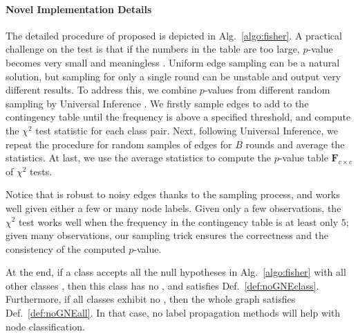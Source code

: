\paragraph{Novel Implementation Details}
The detailed procedure of proposed \methodtest is depicted in Alg.~\ref{algo:fisher}.
A practical challenge on the test is that if the numbers in the table are too large, $p$-value becomes very small and meaningless \cite{lin2013research}.
Uniform edge sampling can be a natural solution, but sampling for only a single round can be unstable and output very different results.
To address this, we combine $p$-values from different random sampling by Universal Inference \cite{wasserman2020universal}.
We firstly sample edges to add to the contingency table until the frequency is above a specified threshold, and compute the $\chi^2$ test statistic for each class pair. 
Next, following Universal Inference, we repeat the procedure for random samples of edges for $B$ rounds and average the statistics.
At last, we use the average statistics to compute the $p$-value table ${\boldsymbol F}_{c \times c}$ of $\chi^2$ tests. 

Notice that \methodtest is robust to noisy edges thanks to the sampling process, and works well given either a few or many node labels.
Given only a few observations, the $\chi^2$ test works well when the frequency in the contingency table is at least only $5$;
given many observations, our sampling trick ensures the correctness and the consistency of the computed $p$-value.


At the end, 
if a class accepts all the null hypotheses in Alg.~\ref{algo:fisher} with all other classes 
, then this class has no \nef, and satisfies Def.~\ref{def:noGNEclass}.
Furthermore, if all classes exhibit no \nef, then the whole graph satisfies Def.~\ref{def:noGNEall}.
In that case, no label propagation methods will help
with node classification.

